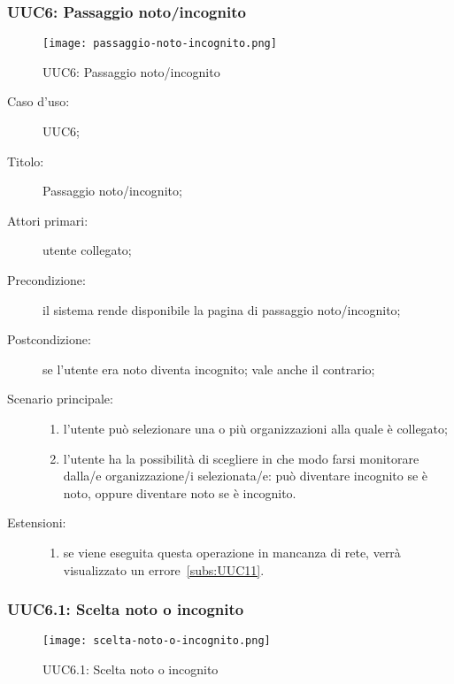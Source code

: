 \documentclass[../../../analisi-dei-requisiti.tex]{subfiles}
\begin{document}
\subsubsection{UUC6: Passaggio noto/incognito}%
\label{subs:UUC6}

\begin{figure}[H]
  \centering
  \texttt{[image: passaggio-noto-incognito.png]}
  \caption{UUC6: Passaggio noto/incognito}%
  \label{fig:UUC6}
\end{figure}

\begin{description}
  \item[Caso d’uso:] UUC6;
  \item[Titolo:] Passaggio noto/incognito;
  \item[Attori primari:] utente collegato;
  \item[Precondizione:] il sistema rende disponibile la pagina di passaggio noto/incognito;
  \item[Postcondizione:] se l'utente era noto diventa incognito; vale anche il contrario;
  \item[Scenario principale:]
        \begin{enumerate}
          \item l'utente può selezionare una o più organizzazioni alla quale è collegato;
          \item l'utente ha la possibilità di scegliere in che modo farsi monitorare dalla/e organizzazione/i selezionata/e:
                può diventare incognito se è noto, oppure diventare noto se è incognito.
        \end{enumerate}
  \item[Estensioni:]
        \begin{enumerate}
          \item se viene eseguita questa operazione in mancanza di rete, verrà visualizzato un errore~\ref{subs:UUC11}.
        \end{enumerate}
\end{description}

\subsubsection{UUC6.1: Scelta noto o incognito}%
\label{subs:UUC6.1}

\begin{figure}[H]
  \centering
  \texttt{[image: scelta-noto-o-incognito.png]}
  \caption{UUC6.1: Scelta noto o incognito}%
  \label{fig:UUC6_1}
\end{figure}
\end{document}
